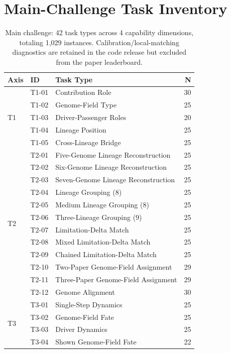 \section{Main-Challenge Task Inventory}
\label{app:tasks}

\begin{table}[h]
\centering
\scriptsize
\caption{Main \geneexam{} challenge: 42 task types across 4 capability dimensions, totaling 1,029 instances. Calibration/local-matching diagnostics are retained in the code release but excluded from the paper leaderboard.}
\label{tab:all_tasks}
\begin{tabular}{@{}p{1.15cm}p{1.2cm}p{5.35cm}r@{}}
\toprule
\textbf{Axis} & \textbf{ID} & \textbf{Task Type} & \textbf{N} \\
\midrule
\multirow{5}{*}{T1} & T1-01 & Contribution Role & 30 \\
& T1-02 & Genome-Field Type & 25 \\
& T1-03 & Driver-Passenger Roles & 20 \\
& T1-04 & Lineage Position & 25 \\
& T1-05 & Cross-Lineage Bridge & 25 \\
\midrule
\multirow{12}{*}{T2} & T2-01 & Five-Genome Lineage Reconstruction & 25 \\
& T2-02 & Six-Genome Lineage Reconstruction & 25 \\
& T2-03 & Seven-Genome Lineage Reconstruction & 25 \\
& T2-04 & Lineage Grouping (8) & 25 \\
& T2-05 & Medium Lineage Grouping (8) & 25 \\
& T2-06 & Three-Lineage Grouping (9) & 25 \\
& T2-07 & Limitation-Delta Match & 25 \\
& T2-08 & Mixed Limitation-Delta Match & 25 \\
& T2-09 & Chained Limitation-Delta Match & 25 \\
& T2-10 & Two-Paper Genome-Field Assignment & 29 \\
& T2-11 & Three-Paper Genome-Field Assignment & 29 \\
& T2-12 & Genome Alignment & 30 \\
\midrule
\multirow{17}{*}{T3} & T3-01 & Single-Step Dynamics & 25 \\
& T3-02 & Genome-Field Fate & 25 \\
& T3-03 & Driver Dynamics & 25 \\
& T3-04 & Shown Genome-Field Fate & 22 \\

\end{tabular}
\end{table}

